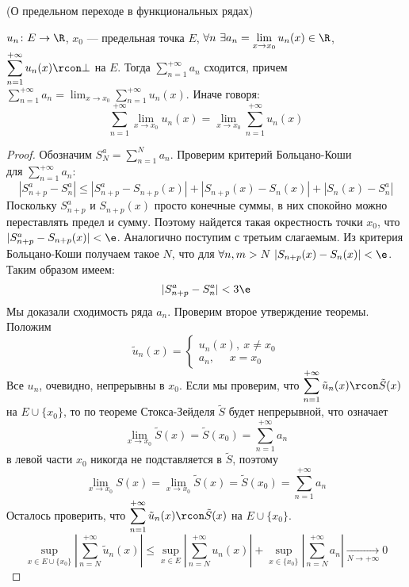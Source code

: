 \begin{theorem}(О предельном переходе в функциональных рядах)

    $u_n \colon E \to \R$, $x_0$ --- предельная точка $E$, $\displaystyle
    \forall n~ \exists a_n = \lim_{x \to x_0}{u_n(x)} \in \R$, $\displaystyle
    \sum_{n = 1}^{+\infty}{u_n(x)} \rcon \bot$ на $E$. Тогда $\displaystyle
    \sum_{n = 1}^{+\infty}{a_n}$ сходится, причем $\displaystyle \sum_{n =
    1}^{+\infty}{a_n} = \lim_{x \to x_0}{\sum_{n = 1}^{+\infty}{u_n(x)}}$.
    Иначе говоря:
\[
    \sum_{n = 1}^{+\infty}{\lim_{x \to x_0}{u_n(x)}}
    = \lim_{x \to x_0}{\sum_{n = 1}^{+\infty}{u_n(x)}}
\]
\end{theorem}
\begin{proof}

    Обозначим $\displaystyle S^a_N = \sum_{n = 1}^{N}{a_n}$. Проверим
    критерий Больцано-Коши \\ для $\displaystyle \sum_{n = 1}^{+\infty}{a_n}$:
\[
    |S^a_{n + p} - S^a_n| \leqslant |S^a_{n + p} - S_{n + p}(x)|
    + |S_{n + p}(x) - S_n(x)|
    + |S_n(x) - S^a_n|
\]
    Поскольку $S^a_{n + p}$ и $S_{n + p}(x)$ просто конечные суммы, в них
    спокойно можно переставлять предел и сумму. Поэтому найдется такая
    окрестность точки $x_0$, что \\ $|S^a_{n + p} - S_{n + p}(x)| < \e$.
    Аналогично поступим с третьим слагаемым. Из критерия Больцано-Коши получаем
    такое $N$, что для $\forall n, m > N~ |S_{n + p}(x) - S_n(x)| < \e$.
    Таким образом имеем:
\[
    |S^a_{n + p} - S^a_n| < 3\e
\]
    Мы доказали сходимость ряда $a_n$. Проверим второе утверждение теоремы.
    Положим
\[
    \tilde{u}_n(x) = \begin{cases}
                    u_n(x),~ x \neq x_0 \\
                    a_n,~~~~~~ x = x_0
                    \end{cases}
\]
    Все $u_n$, очевидно, непрерывны в $x_0$. Если мы проверим, что
    $\displaystyle \sum_{n = 1}^{+\infty}{\tilde{u}_n(x)} \rcon \tilde{S}(x)$
    на $E \cup \{x_0\}$, то по теореме Стокса-Зейделя $\tilde{S}$ будет
    непрерывной, что означает
\[
    \lim_{x \to x_0}{\tilde{S}(x)} = \tilde{S}(x_0) = \sum_{n =
    1}^{+\infty}{a_n}
\]
    в левой части $x_0$ никогда не подставляется в $\tilde{S}$, поэтому
\[
    \lim_{x \to x_0}{S(x)} = \lim_{x \to x_0}{\tilde{S}(x)} = \tilde{S}(x_0) =
    \sum_{n = 1}^{+\infty}{a_n}
\]
    Осталось проверить, что $\displaystyle \sum_{n =
    1}^{+\infty}{\tilde{u}_n(x)} \rcon \tilde{S}(x)$ на $E \cup \{x_0\}$.
\[
    \sup_{x \in E \cup \{x_0\}}{\left|\sum_{n =
    N}^{+\infty}{\tilde{u}_n(x)}\right|} \leqslant \sup_{x \in E}{\left|
    \sum_{n = N}^{+\infty}{u_n(x)} \right|} + \sup_{x \in \{x_0\}}{\left|
    \sum_{n = N}^{+\infty}{a_n} \right|} \xrightarrow[N \to +\infty]{} 0
\]
\end{proof}

